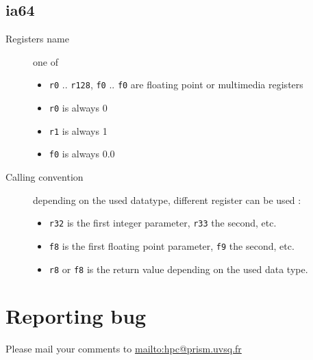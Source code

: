 \documentclass{article}
\begin{document}
\subsection{ia64}
\begin{description}
\item[Registers name] one of
  \begin{itemize}
  \item \verb|r0| .. \verb|r128|, \verb|f0| .. \verb|f0| are floating
    point or multimedia registers
  \item \verb|r0| is always 0
  \item \verb|r1| is always 1
  \item \verb|f0| is always 0.0
  \end{itemize}
\item[Calling convention] depending on the used datatype, different
  register can be used :
  \begin{itemize}
  \item \verb|r32| is the first integer parameter, \verb|r33| the
    second, etc.
  \item \verb|f8| is the first floating point parameter, \verb|f9| the
    second, etc.
  \item \verb|r8| or \verb|f8| is the return value depending on the
    used data type.
  \end{itemize}
\end{description}

\section{Reporting bug}

Please mail your comments to \url{mailto:hpc@prism.uvsq.fr}



\end{document}
